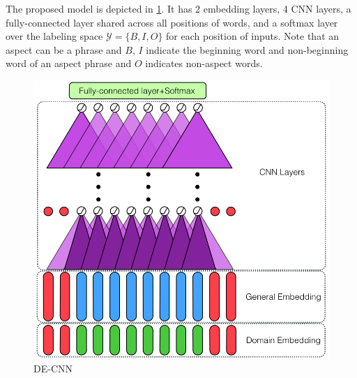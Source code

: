 The proposed model is depicted in \ref{chap6:fig:fr}.
It has 2 embedding layers, 4 CNN layers, a fully-connected layer shared across all positions of words, and a softmax layer over the labeling space $\mathcal{Y}=\{B, I, O\}$ for each position of inputs.
Note that an aspect can be a phrase and $B$, $I$ indicate the beginning word and non-beginning word of an aspect phrase and $O$ indicates non-aspect words.

\begin{figure}[H]
\centering    
\includegraphics[width=5.in]{fig/acl18_fig.png}
    \caption{DE-CNN}
    \label{chap6:fig:fr}
\end{figure}

